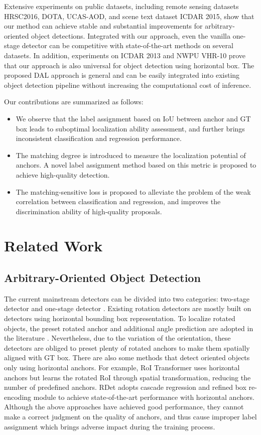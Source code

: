 \documentclass[letterpaper]{article} \usepackage{aaai21}  \usepackage{times}  \usepackage{helvet} \usepackage{courier}  \usepackage[hyphens]{url}  \usepackage{graphicx} \urlstyle{rm} \def\UrlFont{\rm}  \usepackage{natbib}  \usepackage{caption} \frenchspacing  \setlength{\pdfpagewidth}{8.5in}  \setlength{\pdfpageheight}{11in}  \usepackage{url}
\begin{document}
Extensive experiments on public datasets, including remote sensing datasets HRSC2016, DOTA, UCAS-AOD, and scene text dataset ICDAR 2015, show that our method can achieve stable and substantial improvements for arbitrary-oriented object detections. Integrated with our approach, even the vanilla one-stage detector can be competitive with state-of-the-art methods on several datasets. In addition, experiments on ICDAR 2013 and NWPU VHR-10 prove that our approach is also universal for object detection using horizontal box. The proposed DAL approach is general and can be easily integrated into existing object detection pipeline without increasing the computational cost of inference. 

Our contributions are summarized as follows:

\begin{itemize}
	\item We observe that the label assignment based on IoU between anchor and GT box leads to suboptimal localization ability assessment, and further brings inconsistent classification and regression performance.
	\item The matching degree is introduced to measure the localization potential of anchors. A novel label assignment method based on this metric is proposed to achieve high-quality detection.
	\item The matching-sensitive loss is proposed to alleviate the problem of the weak correlation between classification and regression, and improves the discrimination ability of high-quality proposals.
\end{itemize} 

\section{Related Work}
\subsection{Arbitrary-Oriented Object Detection}
The current mainstream detectors can be divided into two categories: two-stage detector \cite{ren2015faster, dai2016r} and one-stage detector \cite{redmon2016you, liu2016ssd}. Existing rotation detectors are mostly built on detectors using horizontal bounding box representation. To localize rotated objects, the preset rotated anchor and additional angle prediction are adopted  in the literature \cite{liu2018arbitrary, ma2018arbitrary, liao2018textboxes++, liu2017rotated}. Nevertheless, due to the variation of the orientation, these detectors are obliged to preset plenty of rotated anchors to make them spatially aligned with GT box. There are also some methods that detect oriented objects only using horizontal anchors. For example, RoI Transformer \cite{ding2019learning} uses horizontal anchors but learns the rotated RoI through spatial transformation, reducing the number of predefined anchors.  RDet\cite{yang2019r3det} adopts cascade regression and refined box re-encoding module to achieve state-of-the-art performance with horizontal anchors. Although the above approaches have achieved good performance, they cannot make a correct judgment on the quality of anchors, and thus cause improper label assignment which brings adverse impact during the training process.
\end{document}
